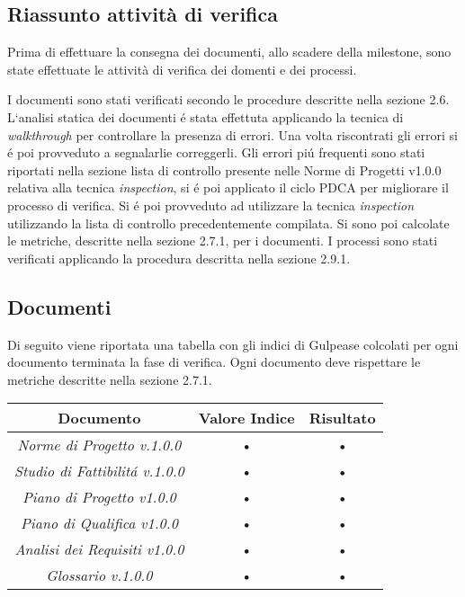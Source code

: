 \subsection{Riassunto attività di verifica}

Prima di effettuare la consegna dei documenti, allo scadere della milestone, sono state effettuate le attività di verifica dei domenti e dei processi.

I documenti sono stati verificati secondo le procedure descritte nella sezione 2.6.
L`analisi statica dei documenti \'e stata effettuta applicando la tecnica di \textit{walkthrough} per controllare la presenza di errori. Una volta riscontrati gli errori si \'e poi provveduto a segnalarlie correggerli. Gli errori pi\'u frequenti sono stati riportati nella sezione lista di controllo presente nelle Norme di Progetti v1.0.0 relativa alla tecnica \textit{inspection}, si \'e poi applicato il ciclo PDCA per migliorare il processo di verifica.
Si \'e poi provveduto ad utilizzare la tecnica \textit{inspection} utilizzando la lista di controllo precedentemente compilata.
Si sono poi calcolate le metriche, descritte nella sezione 2.7.1, per i documenti.
I processi sono stati verificati applicando la procedura descritta nella sezione 2.9.1.

\subsection{Documenti}

Di seguito viene riportata una tabella con gli indici di Gulpease colcolati per ogni documento terminata la fase di verifica.
Ogni documento deve rispettare le metriche descritte nella sezione 2.7.1.\\

\hspace{1cm}

\begin{center}
\begin{tabular}{|c|c|c|}
\hline 
\textbf{Documento} & \textbf{Valore Indice} & \textbf{Risultato} \\ 
\hline
\textit{Norme di Progetto v.1.0.0} & • & • \\ 
\textit{Studio di Fattibilit\'a v.1.0.0} & • & • \\ 
\textit{Piano di Progetto v1.0.0} & • & • \\ 
\textit{Piano di Qualifica v1.0.0} & • & • \\ 
\textit{Analisi dei Requisiti v1.0.0} & • & • \\ 
\textit{Glossario v.1.0.0} & • & • \\ 
\hline 
\end{tabular} 

\end{center}